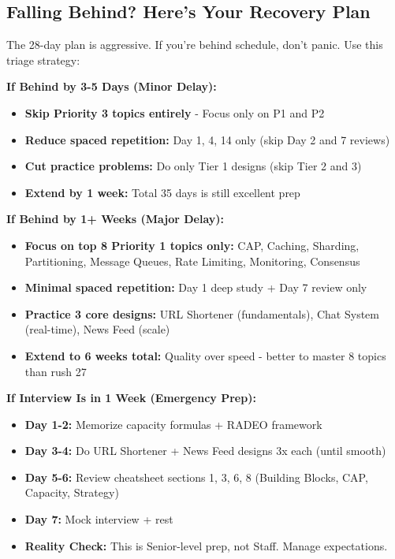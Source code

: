 \documentclass[10pt]{article}
\begin{document}
\subsection{Falling Behind? Here's Your Recovery Plan}

The 28-day plan is aggressive. If you're behind schedule, don't panic. Use this triage strategy:

\textbf{If Behind by 3-5 Days (Minor Delay):}
\begin{itemize}
\item \textbf{Skip Priority 3 topics entirely} - Focus only on P1 and P2
\item \textbf{Reduce spaced repetition:} Day 1, 4, 14 only (skip Day 2 and 7 reviews)
\item \textbf{Cut practice problems:} Do only Tier 1 designs (skip Tier 2 and 3)
\item \textbf{Extend by 1 week:} Total 35 days is still excellent prep
\end{itemize}

\textbf{If Behind by 1+ Weeks (Major Delay):}
\begin{itemize}
\item \textbf{Focus on top 8 Priority 1 topics only:} CAP, Caching, Sharding, Partitioning, Message Queues, Rate Limiting, Monitoring, Consensus
\item \textbf{Minimal spaced repetition:} Day 1 deep study + Day 7 review only
\item \textbf{Practice 3 core designs:} URL Shortener (fundamentals), Chat System (real-time), News Feed (scale)
\item \textbf{Extend to 6 weeks total:} Quality over speed - better to master 8 topics than rush 27
\end{itemize}

\textbf{If Interview Is in 1 Week (Emergency Prep):}
\begin{itemize}
\item \textbf{Day 1-2:} Memorize capacity formulas + RADEO framework
\item \textbf{Day 3-4:} Do URL Shortener + News Feed designs 3x each (until smooth)
\item \textbf{Day 5-6:} Review cheatsheet sections 1, 3, 6, 8 (Building Blocks, CAP, Capacity, Strategy)
\item \textbf{Day 7:} Mock interview + rest
\item \textbf{Reality Check:} This is Senior-level prep, not Staff. Manage expectations.
\end{itemize}
\end{document}
